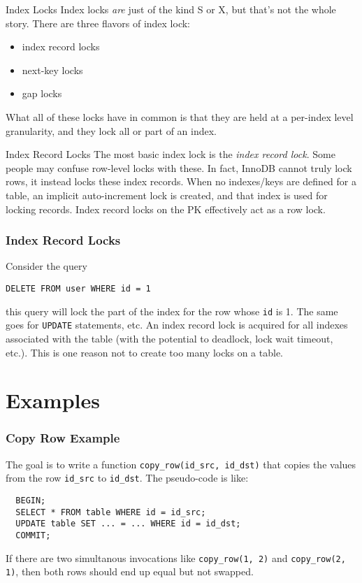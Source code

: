 \documentclass[14pt]{beamer}
\begin{document}
\begin{frame}{Index Locks}
  Index locks \emph{are} just of the kind S or X, but that's not the whole
  story. There are three flavors of index lock:
  \begin{itemize}
    \item index record locks
    \item next-key locks
    \item gap locks
  \end{itemize}
  What all of these locks have in common is that they are held at a per-index
  level granularity, and they lock all or part of an index.
\end{frame}

\begin{frame}{Index Record Locks}
  The most basic index lock is the \emph{index record lock}. Some people may
  confuse row-level locks with these. In fact, InnoDB cannot truly lock rows, it
  instead locks these index records.
  \newline
  \newline
  When no indexes/keys are defined for a table, an implicit auto-increment lock
  is created, and that index is used for locking records. Index record locks on
  the PK effectively act as a row lock.
\end{frame}

\begin{frame}[fragile]
  \frametitle{Index Record Locks}
  Consider the query
\begin{verbatim}
DELETE FROM user WHERE id = 1
\end{verbatim}
  this query will lock the part of the index for the row whose \texttt{id} is
  1. The same goes for \texttt{UPDATE} statements, etc.
  \newline
  \newline
  An index record lock is acquired for all indexes associated with the table
  (with the potential to deadlock, lock wait timeout, etc.). This is one reason
  not to create too many locks on a table.
\end{frame}

\section{Examples}

\begin{frame}[fragile]
  \frametitle{Copy Row Example}
  The goal is to write a function \texttt{copy\_row(id\_src, id\_dst)} that
  copies the values from the row \texttt{id\_src} to \texttt{id\_dst}. The
  pseudo-code is like:
\begin{verbatim}
  BEGIN;
  SELECT * FROM table WHERE id = id_src;
  UPDATE table SET ... = ... WHERE id = id_dst;
  COMMIT;
\end{verbatim}
  If there are two simultanous invocations like \texttt{copy\_row(1, 2)} and
  \texttt{copy\_row(2, 1)}, then both rows should end up equal but not swapped.
\end{frame}
\end{document}
